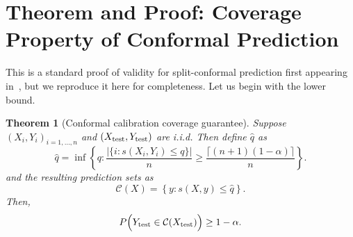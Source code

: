 \documentclass[10pt]{article}
\newtheorem{theorem}{Theorem}
\newcommand{\C}{\mathcal{C}}
\begin{document}
\section{Theorem and Proof: Coverage Property of Conformal Prediction}
\label{app:coverage-proof}
This is a standard proof of validity for split-conformal prediction first appearing in~\cite{papadopoulos2002inductive}, but we reproduce it here for completeness.
Let us begin with the lower bound.

\begin{theorem}[Conformal calibration coverage guarantee]
Suppose $(X_i, Y_i)_{i = 1,\dots,n}$ and $(X_{\rm test}, Y_{\rm test})$ are i.i.d.
Then define $\hat{q}$ as 
\begin{equation}
    \hat{q} = \inf \left\{q : \frac{|\{i : s(X_i, Y_i) \le q\}|}{n} \geq \frac{\lceil (n+1)(1-\alpha) \rceil}{n} \right\}.
\end{equation}
and the resulting prediction sets as
\begin{equation*}
    \C(X) = \left\{y : s(X,y) \le \hat{q}\right\}.
\end{equation*}
Then,
\begin{equation*}
P\Big(Y_{\rm test} \in \C(X_{\rm test})\Big) \ge 1 - \alpha.
\end{equation*}

\end{theorem}
\end{document}
